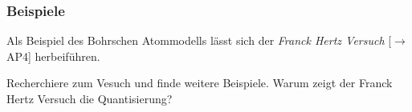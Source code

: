 \documentclass{subfiles}
\begin{document}
    \subsubsection*{Beispiele}
        Als Beispiel des Bohrschen Atommodells lässt sich der \emph{Franck Hertz Versuch} [$\to$ AP4] herbeiführen. 
        \begin{Aufgabe}
            \nr{} Recherchiere zum Vesuch und finde weitere Beispiele. Warum zeigt der Franck Hertz Versuch die Quantisierung?
        \end{Aufgabe}
        
\end{document}
